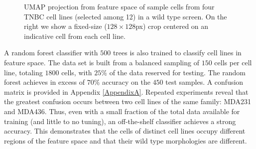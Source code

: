 \begin{figure}[ht]
\caption{UMAP projection from feature space of sample cells from four TNBC cell lines (selected among 12) in a wild type screen. On the right we show a fixed-size ($128\times128$px) crop centered on an indicative cell from each cell line.}
\label{fig:umap_cell_lines}
\end{figure}

A random forest classifier with $500$ trees is also trained to classify cell lines in feature space. The data set is built from a balanced sampling of $150$ cells per cell line, totaling $1800$ cells, with $25\%$ of the data reserved for testing. The random forest achieves in excess of $70\%$ accuracy on the $450$ test samples. A confusion matrix is provided in Appendix \ref{AppendixA}. Repeated experiments reveal that the greatest confusion occurs between two cell lines of the same family: MDA231 and MDA436. Thus, even with a small fraction of the total data available for training (and little to no tuning), an off-the-shelf classifier achieves a strong accuracy. This demonstrates that the cells of distinct cell lines occupy different regions of the feature space and that their wild type morphologies are different.

